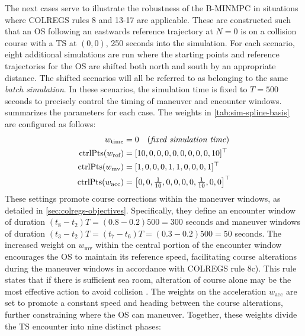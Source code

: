 


The next cases serve to illustrate the robustness of the B-MINMPC in situations where COLREGS rules 8 and 13-17 are applicable. These are constructed such that an OS following an eastwards reference trajectory at $N=0$ is on a collision course with a TS at $(0, 0)$, 250 seconds into the simulation. For each scenario, eight additional simulations are run where the starting points and reference trajectories for the OS are shifted both north and south by an appropriate distance. The shifted scenarios will all be referred to as belonging to the same \emph{batch simulation}.
In these scenarios, the simulation time is fixed to $T=500$ seconds to precisely control the timing of maneuver and encounter windows.  summarizes the parameters for each case. The weights in \cref{tab:sim-spline-basis} are configured as follows:
\begin{subequations}
    \begin{align}
        w_\text{time} &= 0 \quad \text{(\emph{fixed simulation time})}  \\
        \operatorname{ctrlPts}(w_\text{ref}) &= [10, 0, 0, 0, 0, 0, 0, 0, 0, 10]^\top     \\
        \operatorname{ctrlPts}(w_\text{mv}) &= [1, 0, 0, 0, 1, 1, 0, 0, 0, 1]^\top      \\
        \operatorname{ctrlPts}(w_\text{acc}) &= \begin{bmatrix}0, 0, \frac{1}{10}, 0, 0, 0, 0, \frac{1}{10}, 0, 0\end{bmatrix}^\top
    \end{align}
\end{subequations}
These settings promote course corrections within the maneuver windows, as detailed in \cref{sec:colregs-objectives}.  Specifically, they define an encounter window of duration $(t_8-t_2)T=(0.8-0.2)500=300$ seconds and maneuver windows of duration $(t_3-t_2)T=(t_7-t_6)T=(0.3-0.2)500=50$ seconds. The increased weight on $w_\text{mv}$ within the central portion of the encounter window encourages the OS to maintain its reference speed, facilitating course alterations during the maneuver windows in accordance with COLREGS rule 8c). This rule states that if there is sufficient sea room, alteration of course alone may be the most effective action to avoid collision \citep{COLREGS}. The weights on the acceleration $w_\text{acc}$ are set to promote a constant speed and heading between the course alterations, further constraining where the OS can maneuver. Together, these weights divide the TS encounter into nine distinct phases:
